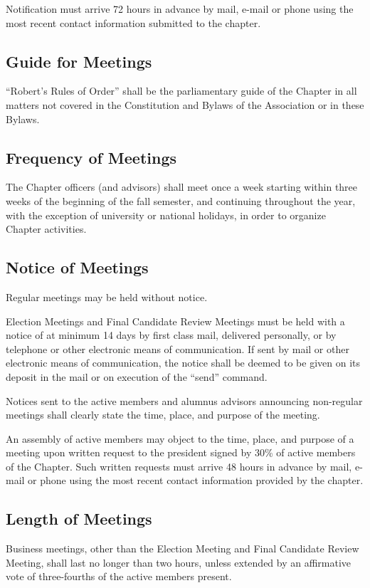 \documentclass{article}
\begin{document}
	Notification must arrive 72 hours in advance by mail, e-mail or phone using the most recent contact information submitted to the chapter.
	
	\subsection{Guide for Meetings}
	``Robert's Rules of Order'' shall be the parliamentary guide of the Chapter in all matters not covered in the Constitution and Bylaws of the Association or in these Bylaws.
	
	\subsection{Frequency of Meetings}	
	The Chapter officers (and advisors) shall meet once a week starting within three weeks of the beginning of the fall semester, and continuing throughout the year, with the exception of university or national holidays, in order to organize Chapter activities.
	
	\subsection{Notice of Meetings}
	Regular meetings may be held without notice.
	
	Election Meetings and Final Candidate Review Meetings must be held with a notice of at minimum 14 days by first class mail, delivered personally, or by telephone or other electronic means of communication. If sent by mail or other electronic means of communication, the notice shall be deemed to be given on its deposit in the mail or on execution of the ``send'' command.
	
	Notices sent to the active members and alumnus advisors announcing non-regular meetings shall clearly state the time, place, and purpose of the meeting.
	
	An assembly of active members may object to the time, place, and purpose of a meeting upon written request to the president signed by 30\% of active members of the Chapter. Such written requests must arrive 48 hours in advance by mail, e-mail or phone using the most recent contact information provided by the chapter.
	
	\subsection{Length of Meetings}
	Business meetings, other than the Election Meeting and Final Candidate Review Meeting, shall last no longer than two hours, unless extended by an affirmative vote of three-fourths of the active members present.
	
\end{document}
